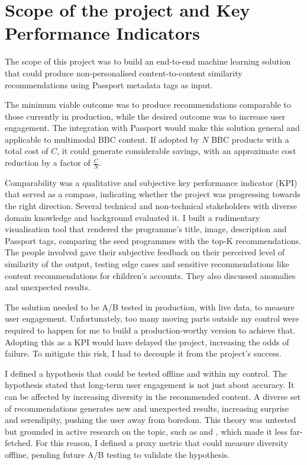 
\section{Scope of the project and Key Performance Indicators}

The scope of this project was to build an end-to-end machine learning solution that could produce non-personalised
content-to-content similarity recommendations using Passport metadata tags as input.

The minimum viable outcome was to produce recommendations comparable to those currently in production,
while the desired outcome was to increase user engagement.
The integration with Passport would make this solution general and applicable to multimodal BBC content.
If adopted by $N$ BBC products with a total cost of $C$,
it could generate considerable savings, with an approximate cost reduction by a factor of $\frac{C}{N}$.

Comparability was a qualitative and subjective key performance indicator (KPI) that served as a compass,
indicating whether the project was progressing towards the right direction.
Several technical and non-technical stakeholders with diverse domain knowledge and background evaluated it.
I built a rudimentary visualisation tool that rendered the programme's title, image, description and Passport tags,
comparing the seed programmes with the top-K recommendations.
The people involved gave their subjective feedback on their perceived level of similarity of the output,
testing edge cases and sensitive recommendations like content recommendations for children's accounts.
They also discussed anomalies and unexpected results.

The solution needed to be A/B tested in production, with live data, to measure user engagement.
Unfortunately, too many moving parts outside my control were required to happen for me to build a
production-worthy version to achieve that.
Adopting this as a KPI would have delayed the project, increasing the odds of failure.
To mitigate this risk, I had to decouple it from the project's success.

I defined a hypothesis that could be tested offline and within my control.
The hypothesis stated that long-term user engagement is not just about accuracy. It can be affected by increasing diversity in the recommended content.
A diverse set of recommendations generates new and unexpected results, increasing surprise and serendipity, pushing the user away from boredom.
This theory was untested but grounded in active research on the topic, such as \cite{Kaminskas2016DiversitySN} and
\cite{duricic2023beyondaccuracyreviewdiversityserendipity}, which made it less far-fetched.
For this reason, I defined a proxy metric that could measure diversity offline, pending future A/B testing to validate the hypothesis.
